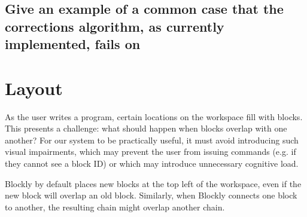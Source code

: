 \documentclass[]{article}
\begin{document}
\subsection{Give an example of a common case that the corrections algorithm, as currently implemented, fails on}

\section{Layout}


As the user writes a program, certain locations on the workspace fill with blocks.
This presents a challenge: what should happen when blocks overlap with one another?
For our system to be practically useful, it must avoid introducing such visual impairments,
which may prevent the user from issuing commands (e.g. if they cannot see a block ID)
or which may introduce unnecessary cognitive load.

Blockly by default places new blocks at the top left of the workspace, even if the new block
will overlap an old block. Similarly, when Blockly connects one block to another, the resulting chain
might overlap another chain.
\end{document}
